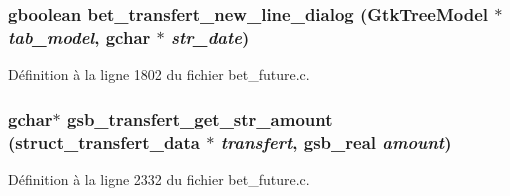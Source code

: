 \subsubsection[{bet\_\-transfert\_\-new\_\-line\_\-dialog}]{\setlength{\rightskip}{0pt plus 5cm}gboolean bet\_\-transfert\_\-new\_\-line\_\-dialog (GtkTreeModel $\ast$ {\em tab\_\-model}, \/  gchar $\ast$ {\em str\_\-date})}\label{bet__future_8h_ac02be860167b4f09f638c3b81f2af565}


Définition à la ligne 1802 du fichier bet\_\-future.c.

\subsubsection[{gsb\_\-transfert\_\-get\_\-str\_\-amount}]{\setlength{\rightskip}{0pt plus 5cm}gchar$\ast$ gsb\_\-transfert\_\-get\_\-str\_\-amount ({\bf struct\_\-transfert\_\-data} $\ast$ {\em transfert}, \/  {\bf gsb\_\-real} {\em amount})}\label{bet__future_8h_a7ba318b5159699e3b2eca0a402826f8e}


Définition à la ligne 2332 du fichier bet\_\-future.c.


